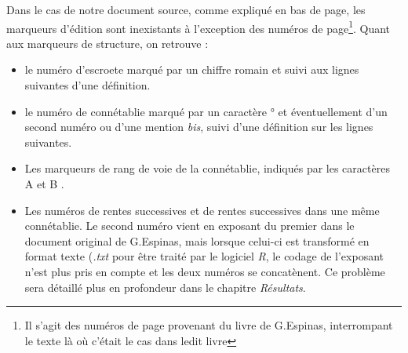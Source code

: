 Dans le cas de notre document source, comme expliqué en bas de page, les marqueurs d'édition sont inexistants à l'exception des numéros de page\footnote{ Il s'agit des numéros de page provenant du livre de G.Espinas, interrompant le texte là où c'était le cas dans ledit livre}. Quant aux marqueurs de structure, on retrouve :
\begin{itemize}
\item le numéro d'escroete marqué par un chiffre romain et suivi aux lignes suivantes d'une définition.
\item le numéro de connétablie marqué par un caractère \og ° \fg et éventuellement d'un second numéro ou d'une mention \textit{bis}, suivi d'une définition sur les lignes suivantes.
\item Les marqueurs de rang de voie de la connétablie, indiqués par les caractères \og A \fg et \og B \fg.
\item Les numéros de rentes successives et de rentes successives dans une même connétablie. Le second numéro vient en exposant du premier dans le document original de G.Espinas, mais lorsque celui-ci est transformé en format texte (\textit{.txt} pour être traité par le logiciel \textit{R}, le codage de l'exposant n'est plus pris en compte et les deux numéros se concatènent. Ce problème sera détaillé plus en profondeur dans le chapitre \textit{Résultats}.  
\end{itemize}










